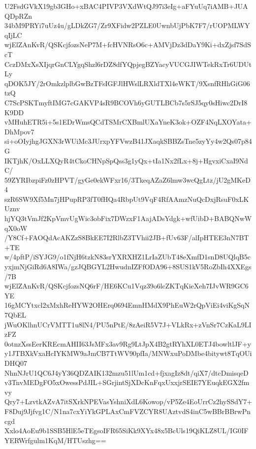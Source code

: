 U2FsdGVkX19gb3GHo+xBAC4PIVP3VXdWtQJ97i3eIg+aFYuUq7iAMB+JUAQDpRZn
34bM9PRYi7uUz4u/gLDkZG7/Zr9XFidw2PZLE0UwnbUjPbK7F7/rUOPMLWYqIjLC
wjElZAnKvR/QSKcjfozsNeP7M+fcHVNRsO6c+AMVjDz3dDaY9Ki+dxZjsf7SdScT
CczDMxXsXIjqrGnCLYgqShzl6rDZ8dfYQpjegBZYacyVUCGJIWTekRxTr6UDUtLy
qDOK5JY/2rOmkzlplbGwBzTFsIGFJlHWslLRXldTXl4eWKT/9XsnfRHhGiG06tzQ
C7ScPSKTmyftIMG7cGAKVP4sR9BCOVh6yGUTLBCb7s5rSJ5qy0sHiwc2DrI8K9DD
vMHuhETR5i+5s1EDrWmsQCdTSMrCXBmlUXaYneK3ok+OZF4NqLXOYata+DhMpov7
si+oOIyjhgJGXN3rWUiMc3JUrxpYFVwzB41JXaqkSBBZsTne5zyYy4w2Qs07p84G
IKTjhK/OxLLXQyR4tCkoCHNpSpQss3g1yQx+tIa1Nx2fLx+8j+HgvxiCxaI9NdC/
59ZYRIbzpiFz0zHPVT/gyGe0ekWFxr16/3TkeqAZaZ6lmw3wcQgLtz/jU2gMKeD4
szR6SW9Xf5Mn7jHPupRP3fT0fHQa4RbpUt9VqF4RfAAmzNuQcDxjRsuF0xLKUznv
hjYQ3tVmJf2KpVmvUgWic3obFix7DWzxF1AajADsYdgk+wfUibD+BABQNwWqX0oW
/Y8Cf+FAOQdAcAKZzS8BkEE7I2RlbZ3TVhii2JB+fUv63F/alIpHTEE3nN7BT+TE
w/4pftP/iSYJG9/o1fNjH6tzkN83srYXRXHZ1LrIaZUbT48eXmfD1snD8UQlqB5c
yxjmNjGiRd6A8IWa/gzJQBGYL2HwudnIZFfODA96+8SUS1kV5RoZbIh4XXEgs/7B
wjElZAnKvR/QSKcjfozsNQ6rF/HE6KCu1Vqz39o6lcZKTqKieXeh7IJvWR9GC6YE
16gMCYtxcl2xMxhReHYW2OHErq0694EmnHMdX9PhEuW2rQpViEi4viKgSqN7QbEL
jWuOKlhnUCrVMTT1u8lN4/PU5nPtE/8zAeiR5V7J+VLkRx+zVnSr7CzKaL9LIzFZ
0otnzXssEerKREcmAHII63JsMFx3av9Rg9LtJpX4B2gtRYhXL0ETJ4bowltlJF+y
y1JTBXkVxaHcIYKMW9aJmCB7TtWV90pfIa/MNWxuPoDMbe4bitywt8TqOUiDHQ07
NhnNJrU1QC6J4yY36QDZAIK132mzu51lUm1cd+fjxagIz8dt/qiX7/dtcDmisqeD
v3TnvMEDgFO5xOwessPdJIL+SGrjintSjXDcKnFqxUxxjrSEIE7YEuqkEGX2fmvy
Qry7+LzvtkAZvA7itSXrkNPEVasYshniXdL6Kowop/vP5Ze4EoUrrCz2hySSdY7+
F8Duj9Jjfvg1C/N1na7cxYiYkGPLAxCmFVZCYR8UAztvdS4inC5wBBrBBrwPncgd
Xxlo4AoEu9b1SSB5HlE5eTEgsoIFR65SiKk9XYx48x5BcUls19QiKLZ8UL/IG0IF
YERWrfgulm1KqM/HTUszhg==
